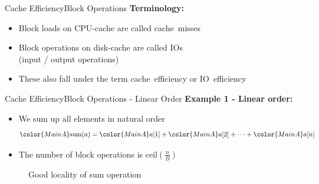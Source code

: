 
\begin{frame}{Cache Efficiency}{Block Operations}
  \textbf{Terminology:}
  \begin{itemize}
    \item<2->
      Block loads on CPU-cache are called {\color{MainA}cache~misses}
    \item<3->
      Block operations on disk-cache are called {\color{MainA}IOs}\\
      (input / output operations)
    \item<4->
      These also fall under the term {\color{MainA}cache~efficiency} or
      {\color{MainA}IO~efficiency}
  \end{itemize}
\end{frame}


\begin{frame}{Cache Efficiency}{Block Operations - Linear Order}
  \vspace{-1.0em}
  \textbf{Example 1 - Linear order:}
  \begin{itemize}
    \item<2->
      We sum up all elements in {\color{MainA}natural order}
      \begin{displaymath}
        {\color{MainA}\mathrm{sum}(a)} =
        {\color{MainA}a[1]} +
        {\color{MainA}a[2]} +
        \dots +
        {\color{MainA}a[n]}
      \end{displaymath}
    \item<3->
      The number of block operations is
      {\color{MainA}$\mathrm{ceil}\left(\frac{n}{B}\right)$}
  \end{itemize}
  \vspace{-1.0em}
  \begin{figure}%
    \begin{adjustbox}{width=\linewidth}%
    \end{adjustbox}%
    \caption{Good locality of sum operation}
    \label{fig:caching:memory_locality_linear}
  \end{figure}%
\end{frame}


